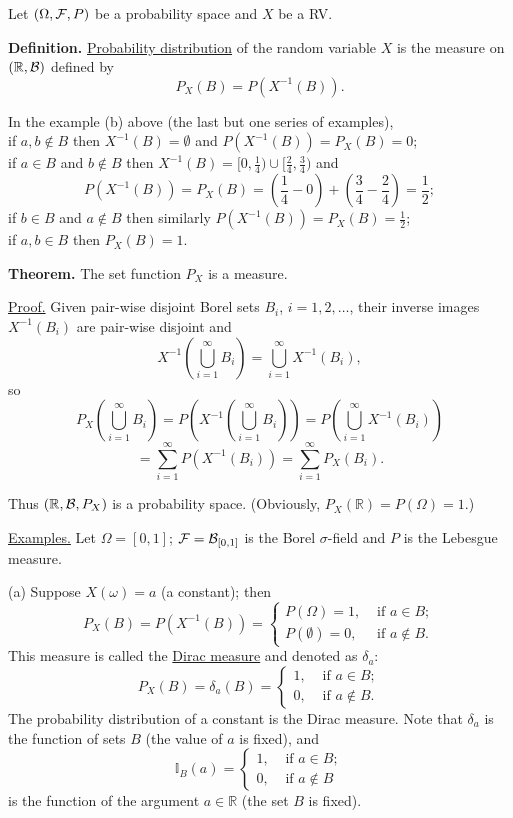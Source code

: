 \documentclass[a4paper,10pt]{article}
\def\RR{\mathbb{R}}
\def\II{\mathbb{I}}
\newcommand{\1}[1]{\mathbf{1}_{\{#1\}}}
\begin{document}
Let $(\Omega,{\cal F},P)$ be a probability space and $X$ be a RV. \vspace{3mm}

{\bf Definition.} \underline{Probability distribution} of the random variable $X$ is the measure on $(\RR,{\cal B})$ defined by
  $$P_X(B)=P(X^{-1}(B)).$$
\vspace{3mm}

In the example (b) above (the last but one series of examples),\\
if $a,b\notin B$ then $X^{-1}(B)=\emptyset$ and $P(X^{-1}(B))=P_X(B)=0$;\\
if  $a\in B$ and $b\notin B$ then $X^{-1}(B)=[0,\frac{1}{4})\cup[\frac{2}{4},\frac{3}{4})$ and
  $$P(X^{-1}(B))=P_X(B)=\left(\frac{1}{4}-0\right)+\left(\frac{3}{4}-\frac{2}{4}\right)=\frac{1}{2};$$
if $b\in B$ and $a\notin B$ then similarly $P(X^{-1}(B))=P_X(B)=\frac{1}{2}$;\\
if $a,b\in B$ then $P_X(B)=1$.\vspace{3mm}

{\bf Theorem.} The set function $P_X$ is a measure. \vspace{3mm}

\underline{Proof.} Given pair-wise disjoint Borel sets $B_i$, $i=1,2,\ldots$, their inverse images $X^{-1}(B_i)$ are pair-wise disjoint and
  $$X^{-1}\left(\bigcup_{i=1}^\infty B_i\right)=\bigcup_{i=1}^\infty X^{-1}(B_i),$$
so
  $$P_X\left(\bigcup_{i=1}^\infty B_i\right)=P\left(X^{-1}\left(\bigcup_{i=1}^\infty B_i\right)\right)=P\left(\bigcup_{i=1}^\infty X^{-1}(B_i)\right)$$
    $$=\sum_{i=1}^\infty P(X^{-1}(B_i))=\sum_{i=1}^\infty P_X(B_i).$$
\blacksquare\vspace{3mm}

Thus $(\RR,{\cal B}, P_X)$ is a probability space. (Obviously, $P_X(\RR)=P(\Omega)=1$.)\vspace{3mm}

\underline{Examples.}  Let $\Omega=[0,1]$; ${\cal F}={\cal B}_{[0,1]}$ is the Borel $\sigma$-field and $P$ is the Lebesgue measure.

(a) Suppose $X(\omega)=a$ (a constant); then
  $$P_X(B)=P(X^{-1}(B))=\left\{\begin{array}{ll} P(\Omega)=1, & \mbox{ if } a\in B; \\  P(\emptyset)=0, & \mbox{ if } a\notin B. \end{array}\right. $$
This measure is called the \underline{Dirac measure} and denoted as $\delta_a$:
$$P_X(B)=\delta_a(B)=\left\{\begin{array}{ll} 1, & \mbox{ if } a\in B; \\  0, & \mbox{ if } a\notin B. \end{array}\right. $$
The probability distribution of a constant is the Dirac measure. Note that $\delta_a$ is the function of sets $B$ (the value of $a$ is fixed), and
  $$\II_B(a)=\left\{\begin{array}{ll} 1, & \mbox{ if } a\in B; \\  0, & \mbox{ if } a\notin B \end{array}\right. $$
is the function of the argument $a\in\RR$ (the set $B$ is fixed).
\end{document}
